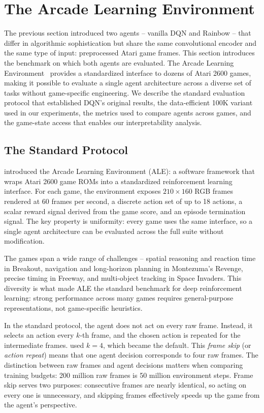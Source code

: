 \section{The Arcade Learning Environment}
\label{sec:ale}

The previous section introduced two agents -- vanilla DQN and
Rainbow -- that differ in algorithmic sophistication but share the
same convolutional encoder and the same type of input: preprocessed
Atari game frames. This section introduces the benchmark on which
both agents are evaluated. The Arcade Learning
Environment~\citep{bellemare2013arcade} provides a standardized
interface to dozens of Atari 2600 games, making it possible to
evaluate a single agent architecture across a diverse set of tasks
without game-specific engineering. We describe the standard
evaluation protocol that established DQN's original results, the
data-efficient 100K variant used in our experiments, the metrics
used to compare agents across games, and the game-state access
that enables our interpretability analysis.

\subsection{The Standard Protocol}
\label{subsec:standard-protocol}

\citet{bellemare2013arcade} introduced the Arcade Learning
Environment (ALE): a software framework that wraps Atari 2600 game
ROMs into a standardized reinforcement learning interface. For
each game, the environment exposes $210 \times 160$ RGB frames
rendered at 60 frames per second, a discrete action set of up to
18 actions, a scalar reward signal derived from the game score, and
an episode termination signal. The key property is uniformity:
every game uses the same interface, so a single agent architecture
can be evaluated across the full suite without modification.

\smallskip
The games span a wide range of challenges -- spatial reasoning and
reaction time in Breakout, navigation and long-horizon planning in
Montezuma's Revenge, precise timing in Freeway, and multi-object
tracking in Space Invaders. This diversity is what made ALE the
standard benchmark for deep reinforcement learning: strong
performance across many games requires general-purpose
representations, not game-specific heuristics.

\smallskip
In the standard protocol, the agent does not act on every raw
frame. Instead, it selects an action every $k$-th frame, and the
chosen action is repeated for the intermediate frames.
\citet{mnih2015human} used $k = 4$, which became the default. This
\emph{frame skip} (or \emph{action repeat}) means that one agent
decision corresponds to four raw frames. The distinction between
raw frames and agent decisions matters when comparing training
budgets: 200 million raw frames is 50 million environment steps.
Frame skip serves two purposes: consecutive frames are nearly
identical, so acting on every one is unnecessary, and skipping
frames effectively speeds up the game from the agent's perspective.

